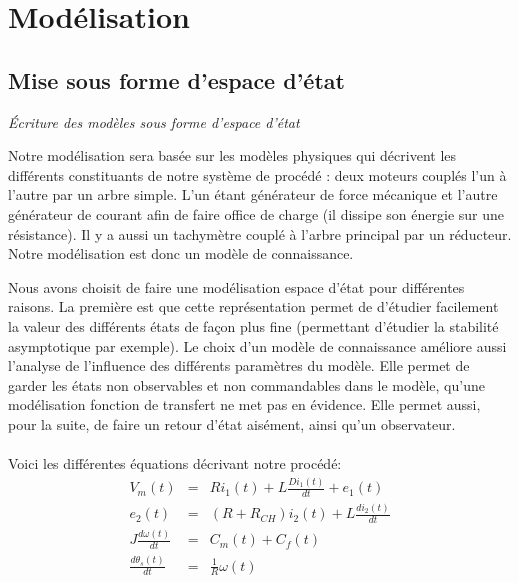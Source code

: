\chapter{Modélisation}
\section{Mise sous forme d'espace d'état}
\textit{Écriture des modèles sous forme d'espace d'état}

Notre modélisation sera basée sur les modèles physiques qui décrivent les différents constituants de notre système de procédé : deux moteurs couplés l'un à l'autre par un arbre simple. L'un étant générateur de force mécanique et l'autre générateur de courant afin de faire office de charge (il dissipe son énergie sur une résistance). Il y a aussi un tachymètre couplé à l'arbre principal par un réducteur.
Notre modélisation est donc un modèle de connaissance.

Nous avons choisit de faire une modélisation espace d'état pour différentes raisons. La première est que cette représentation permet de d'étudier facilement la valeur des différents états de façon plus fine (permettant d'étudier la stabilité asymptotique par exemple). Le choix d'un modèle de connaissance améliore aussi l'analyse de l'influence des différents paramètres du modèle. Elle permet de garder les états non observables et non commandables dans le modèle, qu'une modélisation fonction de transfert ne met pas en évidence. Elle permet aussi, pour la suite, de faire un retour d'état aisément, ainsi qu'un observateur. \\ \\




\hspace{5mm} \textbullet \hspace{5mm} Voici les différentes équations décrivant notre procédé:
\begin{eqnarray}
V_m(t)  					&=& 	R i_1(t) + L \frac{D i_1(t)}{d t} + e_1(t) \\
e_2(t) 						&=& 	(R+R_{CH}) i_2(t) + L \frac{d i_2(t)}{d t} \\
J \frac{d \omega(t)}{dt} 	&=&		C_m(t) + C_f(t)		\\
 \frac{d \theta_s(t)}{dt} 	&=&		\frac{1}{R}\omega(t) \\
\end{eqnarray}

